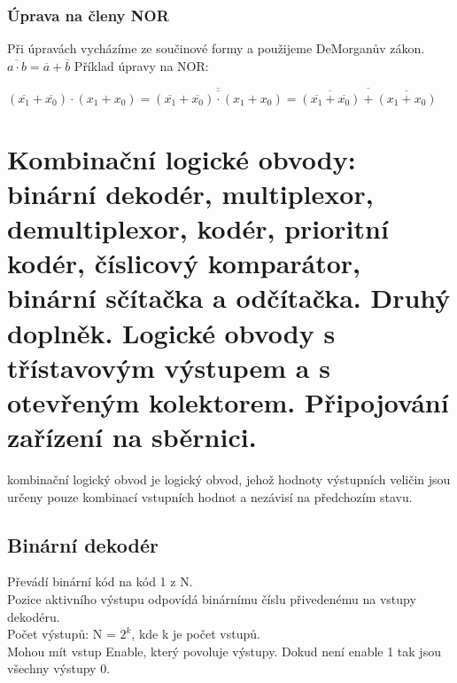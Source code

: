\subsubsection{Úprava na členy NOR}
Při úpravách vycházíme ze součinové formy a použijeme DeMorganův zákon. \(\overline{a \cdot b} = \overline{a} + \overline{b}\)
Příklad úpravy na NOR:
\begin{center}
    \((\overline{x_1}+\overline{x_0})\cdot (x_1 + x_0) = \overline{\overline{(\overline{x_1}+\overline{x_0})\cdot (x_1 + x_0)}} = \overline{\overline{(\overline{x_1}+\overline{x_0})}+\overline{(x_1+x_0)}}\)
\end{center}

\section{Kombinační logické obvody: binární dekodér, multiplexor, demultiplexor, kodér, prioritní kodér, číslicový komparátor, binární sčítačka a odčítačka. Druhý doplněk. Logické obvody s třístavovým výstupem a s otevřeným kolektorem. Připojování zařízení na sběrnici.}
kombinační logický obvod je logický obvod, jehož hodnoty výstupních veličin jsou určeny pouze kombinací vstupních hodnot a nezávisí na předchozím stavu.

\subsection{Binární dekodér}
Převádí binární kód na kód 1 z N.\\
Pozice aktivního výstupu odpovídá binárnímu číslu přivedenému na vstupy dekodéru.\\
Počet výstupů: N = \(2^k\), kde k je počet vstupů.\\
Mohou mít vstup Enable, který povoluje výstupy. Dokud není enable 1 tak jsou všechny výstupy 0.

